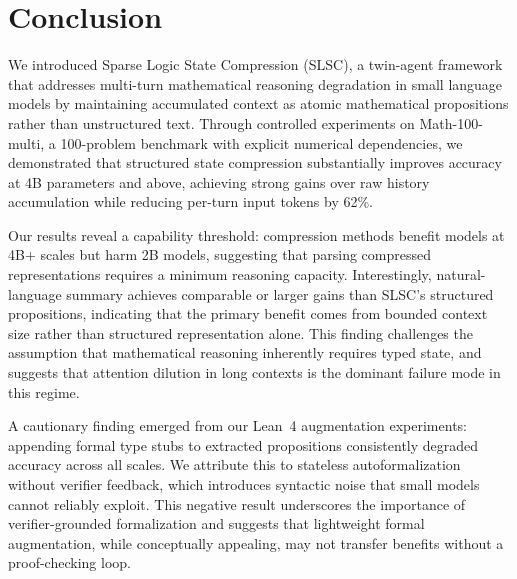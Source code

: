 \section{Conclusion}
\label{sec:conclusion}

We introduced Sparse Logic State Compression (SLSC), a twin-agent framework that addresses 
 multi-turn mathematical reasoning degradation in
small language models by maintaining accumulated context as atomic mathematical propositions rather than unstructured text. Through controlled experiments on Math-100-multi, a 100-problem benchmark with explicit numerical dependencies, we demonstrated that structured state compression substantially improves accuracy at 4B parameters and above, achieving strong gains over raw history accumulation while reducing per-turn input tokens by 62\%.

Our results reveal a capability threshold: compression methods benefit models at 4B+ scales but harm 2B models, suggesting that parsing compressed representations requires a minimum reasoning capacity. Interestingly, natural-language summary achieves comparable or larger gains than SLSC's structured propositions, indicating that the primary benefit comes from bounded context size rather than structured representation alone. This finding challenges the assumption that mathematical reasoning inherently requires typed state, and suggests that attention dilution in long contexts is the dominant failure mode in this regime.

A cautionary finding emerged from our Lean~4 augmentation experiments: appending formal type stubs to extracted propositions consistently degraded accuracy across all scales. We attribute this to stateless autoformalization without verifier feedback, which introduces syntactic noise that small models cannot reliably exploit. This negative result underscores the importance of verifier-grounded formalization and suggests that lightweight formal augmentation, while conceptually appealing, may not transfer benefits without a proof-checking loop.
